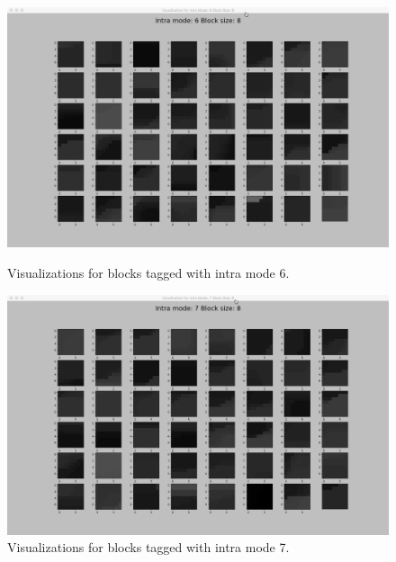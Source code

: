 \begin{figure}
        \vspace*{1cm} %
    
        \begin{minipage}{0.49\textwidth}
            \includegraphics[width=\linewidth]{Figures/visu-size8x8/8-6}
            \caption[Visualizations for blocks tagged with intra mode 6]{Visualizations for blocks tagged with intra mode 6.}
            \label{fig:size8_mode6}
        \end{minipage}
        \hspace{\fill} %
        \begin{minipage}{0.49\textwidth}
            \includegraphics[width=\linewidth]{Figures/visu-size8x8/8-7}
            \caption[Visualizations for blocks tagged with intra mode 7]{Visualizations for blocks tagged with intra mode 7.}
            \label{fig:size8_mode7}
        \end{minipage}
        

\end{figure}
